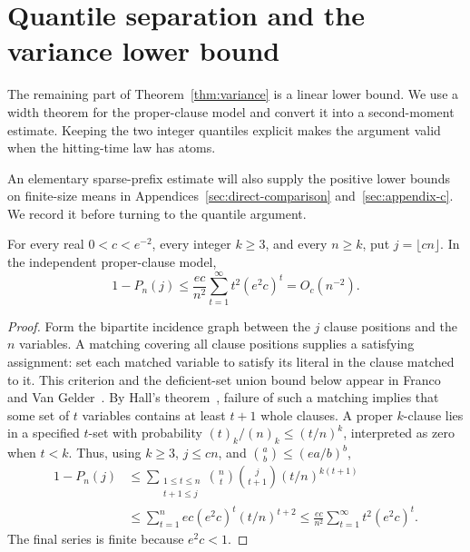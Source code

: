 \section{Quantile separation and the variance lower bound}\label{sec:lower-bounds}

The remaining part of Theorem~\ref{thm:variance} is a linear lower
bound. We use a width theorem for the proper-clause model and convert
it into a second-moment estimate. Keeping the two integer quantiles
explicit makes the argument valid when the hitting-time law has atoms.

An elementary sparse-prefix estimate will also supply the positive lower
bounds on finite-size means in Appendices~\ref{sec:direct-comparison}
and~\ref{sec:appendix-c}. We record it before turning to the quantile
argument.

\begin{lemma}\label{lem:sparse-satisfiability}
For every real $0<c<e^{-2}$, every integer $k\ge3$, and every $n\ge k$,
put $j=\lfloor cn\rfloor$. In the independent proper-clause model,
\begin{equation}\label{eq:sparse-satisfiability}
 1-P_n(j)\le\frac{ec}{n^2}\sum_{t=1}^{\infty}t^2(e^2c)^t=O_c(n^{-2}).
\end{equation}
\end{lemma}

\begin{proof}
Form the bipartite incidence graph between the $j$ clause positions and
the $n$ variables. A matching covering all clause positions supplies a
satisfying assignment: set each matched variable to satisfy its literal
in the clause matched to it. This criterion and the deficient-set union
bound below appear in Franco and Van Gelder~\cite[Section~8]{FrancoVanGelder2003}.
By Hall's theorem~\cite[Theorem~1]{Hall1935}, failure of such a matching
implies that some set of $t$ variables contains at least $t+1$ whole
clauses. A proper $k$-clause lies in a specified $t$-set with probability
$(t)_k/(n)_k\le(t/n)^k$, interpreted as zero when $t<k$. Thus, using
$k\ge3$, $j\le cn$, and $\binom ab\le(ea/b)^b$,
\begin{align*}
 1-P_n(j)
 &\le\sum_{\substack{1\le t\le n\\t+1\le j}}
       \binom nt\binom j{t+1}(t/n)^{k(t+1)}\\
 &\le\sum_{t=1}^{n}ec(e^2c)^t(t/n)^{t+2}
 \le\frac{ec}{n^2}\sum_{t=1}^{\infty}t^2(e^2c)^t.
\end{align*}
The final series is finite because $e^2c<1$.
\end{proof}


